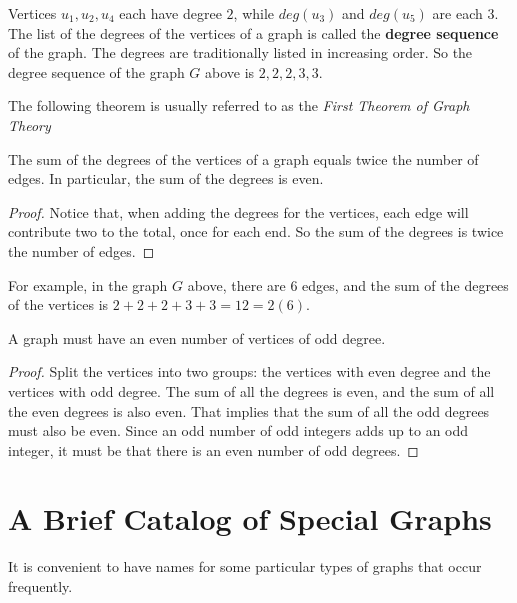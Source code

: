 Vertices $u_1, u_2, u_4$ each have degree $2$, while $deg(u_3)$ and $deg(u_5)$ are each $3$.
The list of the degrees of the vertices of a graph is called the {\bfseries degree sequence} of the graph.
The degrees are traditionally listed in increasing order. So the degree sequence of the graph $G$ above is $2,2,2,3,3$.

The following theorem is usually referred to as the {\it First Theorem of Graph Theory}


\begin{thm}
 The sum of the degrees of the vertices of a graph equals twice the number of edges. In particular, the sum of the degrees is even.
\end{thm}
\begin{proof}
 Notice that, when adding the degrees for the vertices,
each edge will contribute two to the total, once for each end.
So the sum of the degrees is twice the number of edges. 
\end{proof}

For example, in the graph $G$ above, there are $6$ edges, and the sum of the degrees of the vertices is $2+2+2+3+3= 12 = 2(6)$.


\begin{corollary}
 A graph must have an even number of vertices of odd degree.
 \end{corollary}
 \begin{proof}
Split the vertices into two groups: the vertices with even degree and the vertices with odd degree. The sum of all the degrees is even, and the sum of all the even degrees is also even. That implies that the sum of all the odd degrees must also be even. Since an odd number of odd integers adds up to an odd integer, it must be that there is an even number of odd degrees.
\end{proof}

\section{A Brief Catalog of Special Graphs} 
 

It is convenient to have names for some particular types of graphs that occur frequently. 

